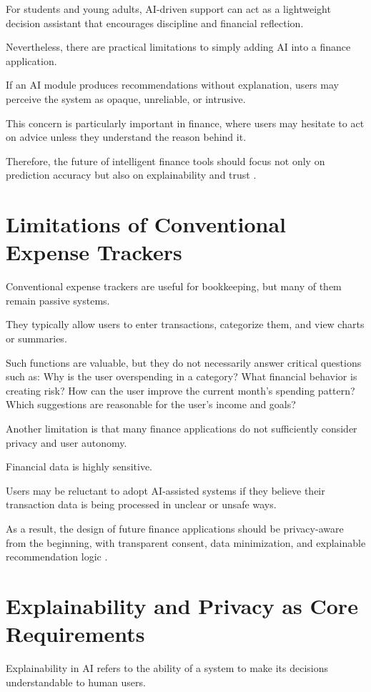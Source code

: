 \documentclass[12pt,a4paper]{report}
\begin{document}
For students and young adults,
AI-driven support can act as a lightweight decision assistant that encourages discipline and financial reflection.

Nevertheless,
there are practical limitations to simply adding AI into a finance application.

If an AI module produces recommendations without explanation,
users may perceive the system as opaque, unreliable, or intrusive.

This concern is particularly important in finance,
where users may hesitate to act on advice unless they understand the reason behind it.

Therefore,
the future of intelligent finance tools should focus not only on prediction accuracy but also on explainability and trust \cite{ref6,ref7,ref8}.

\section{Limitations of Conventional Expense Trackers}
Conventional expense trackers are useful for bookkeeping,
but many of them remain passive systems.

They typically allow users to enter transactions,
categorize them,
and view charts or summaries.

Such functions are valuable,
but they do not necessarily answer critical questions such as:
Why is the user overspending in a category?
What financial behavior is creating risk?
How can the user improve the current month’s spending pattern?
Which suggestions are reasonable for the user’s income and goals?

Another limitation is that many finance applications do not sufficiently consider privacy and user autonomy.

Financial data is highly sensitive.

Users may be reluctant to adopt AI-assisted systems if they believe their transaction data is being processed in unclear or unsafe ways.

As a result,
the design of future finance applications should be privacy-aware from the beginning,
with transparent consent,
data minimization,
and explainable recommendation logic \cite{ref4,ref10,ref11}.

\section{Explainability and Privacy as Core Requirements}
Explainability in AI refers to the ability of a system to make its decisions understandable to human users.
\end{document}
